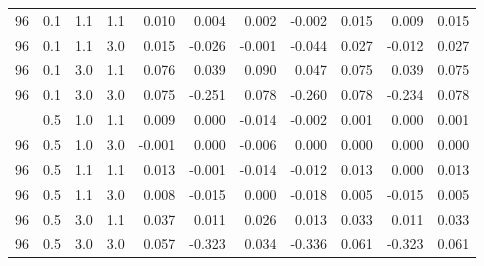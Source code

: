 \begin{longtable}[t]{ccccrrrrrrc}
96 & 0.1 & 1.1 & 1.1 & 0.010 & 0.004 & 0.002 & -0.002 & 0.015 & 0.009 & 0.015\\
96 & 0.1 & 1.1 & 3.0 & 0.015 & -0.026 & -0.001 & -0.044 & 0.027 & -0.012 & 0.027\\
96 & 0.1 & 3.0 & 1.1 & 0.076 & 0.039 & 0.090 & 0.047 & 0.075 & 0.039 & 0.075\\
96 & 0.1 & 3.0 & 3.0 & 0.075 & -0.251 & 0.078 & -0.260 & 0.078 & -0.234 & 0.078\\
\addlinespace
96 & 0.5 & 1.0 & 1.1 & 0.009 & 0.000 & -0.014 & -0.002 & 0.001 & 0.000 & 0.001\\
96 & 0.5 & 1.0 & 3.0 & -0.001 & 0.000 & -0.006 & 0.000 & 0.000 & 0.000 & 0.000\\
96 & 0.5 & 1.1 & 1.1 & 0.013 & -0.001 & -0.014 & -0.012 & 0.013 & 0.000 & 0.013\\
96 & 0.5 & 1.1 & 3.0 & 0.008 & -0.015 & 0.000 & -0.018 & 0.005 & -0.015 & 0.005\\
96 & 0.5 & 3.0 & 1.1 & 0.037 & 0.011 & 0.026 & 0.013 & 0.033 & 0.011 & 0.033\\
96 & 0.5 & 3.0 & 3.0 & 0.057 & -0.323 & 0.034 & -0.336 & 0.061 & -0.323 & 0.061\\
\bottomrule
\end{longtable}
\endgroup{}

